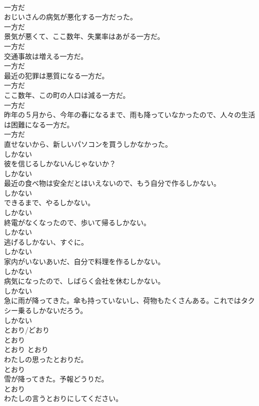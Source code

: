 \documentclass[8pt]{extreport}
\begin{document}
\begin{CJK}{UTF8}{min}
\\	一方だ
\\	おじいさんの病気が悪化する一方だった。	
\\	一方だ
\\	景気が悪くて、ここ数年、失業率はあがる一方だ。	
\\	一方だ
\\	交通事故は増える一方だ。	
\\	一方だ
\\	最近の犯罪は悪質になる一方だ。	
\\	一方だ
\\	ここ数年、この町の人口は減る一方だ。	
\\	一方だ
\\	昨年の５月から、今年の春になるまで、雨も降っていなかったので、人々の生活は困難になる一方だ。	
\\	一方だ
\\	直せないから、新しいパソコンを買うしかなかった。	
\\	しかない
\\	彼を信じるしかないんじゃないか？	
\\	しかない
\\	最近の食べ物は安全だとはいえないので、もう自分で作るしかない。	
\\	しかない
\\	できるまで、やるしかない。	
\\	しかない
\\	終電がなくなったので、歩いて帰るしかない。	
\\	しかない
\\	逃げるしかない、すぐに。	
\\	しかない
\\	家内がいないあいだ、自分で料理を作るしかない。	
\\	しかない
\\	病気になったので、しばらく会社を休むしかない。	
\\	しかない
\\	急に雨が降ってきた。傘も持っていないし、荷物もたくさんある。これではタクシー乗るしかないだろう。	
\\	しかない
\\	とおり/どおり	
\\	とおり	
\\	とおり	とおり
\\	わたしの思ったとおりだ。	
\\	とおり
\\	雪が降ってきた。予報どうりだ。	
\\	とおり
\\	わたしの言うとおりにしてください。	

\end{CJK}
\end{document}
